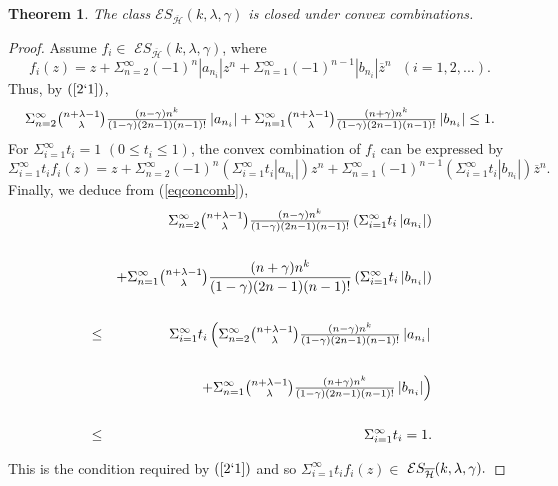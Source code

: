\documentclass[12pt,reqno]{amsart}
\newtheorem{theorem}{Theorem}
\begin{document}
\begin{theorem}
The class $\mathcal{E}S_{\overline{\mathcal{H}}}(k,\lambda ,\gamma)$ is closed under convex combinations.
\end{theorem}

\begin{proof}
Assume $f_{i}\in $ $\mathcal{E}S_{\overline{\mathcal{H}}}(k,\lambda ,\gamma )$, where
\begin{equation*}
f_{i}(z)=z+\Sigma_{n=2}^{\infty}(-1)^{n}\left\vert
a_{n_{i}}\right\vert z^{n}+\Sigma_{n=1}^{\infty}
(-1)^{n-1}\left\vert b_{n_{i}}\right\vert \overline{z}^{n} \ \ \ (i=1,2,...).
\end{equation*}%
Thus, by $(\ref{2`1})$,%
\begin{equation}
\Sigma_{n=2}^{\infty}\tbinom{n+\lambda -1}{\lambda }\tfrac{(n-\gamma )n^{k}}{(1-\gamma )(2n-1)(n-1)!}\left\vert a_{n_{i}}\right\vert +
\Sigma_{n=1}^{\infty}\tbinom{n+\lambda -1}{\lambda }\tfrac{
(n+\gamma )n^{k}}{(1-\gamma )(2n-1)(n-1)!}\left\vert b_{n_{i}}\right\vert
\leq 1.  \label{eqconcomb}
\end{equation}%
For $\Sigma_{i=1}^{\infty}t_{i}=1$ $\left( 0\leq
t_{i}\leq 1\right) $, the convex combination of $f_{i}$ can be expressed by%
\begin{equation*}
\Sigma_{i=1}^{\infty}t_{i}f_{i}(z)=z+\Sigma_{n=2}^{\infty}(-1)^{n}\left( \Sigma_{i=1}^{\infty}
t_{i}\left\vert a_{n_{i}}\right\vert \right) z^{n}+\Sigma_{n=1}^{\infty}(-1)^{n-1}\left( \Sigma_{i=1}^{\infty}t_{i}\left\vert b_{n_{i}}\right\vert \right) \overline{z}^{n}.
\end{equation*}
Finally, we deduce from (\ref{eqconcomb}),
\begin{eqnarray*}
&&\Sigma_{n=2}^{\infty}\tbinom{n+\lambda -1}{\lambda }%
\tfrac{(n-\gamma )n^{k}}{(1-\gamma )(2n-1)(n-1)!}\left( \Sigma_{i=1}^{\infty}t_{i}\left\vert a_{n_{i}}\right\vert \right) \\
&& \\
&&+\Sigma_{n=1}^{\infty}\tbinom{n+\lambda -1}{\lambda }%
\frac{(n+\gamma )n^{k}}{(1-\gamma )(2n-1)(n-1)!}\left( \Sigma_{i=1}^{\infty}t_{i}\left\vert b_{n_{i}}\right\vert \right) \\
&& \\
&\leq &\Sigma_{i=1}^{\infty}t_{i}\left( \Sigma_{n=2}^{\infty}\tbinom{n+\lambda -1}{\lambda }\tfrac{(n-\gamma )n^{k}%
}{(1-\gamma )(2n-1)(n-1)!}\left\vert a_{n_{i}}\right\vert \right. \\
&& \\
&&\left. +\Sigma_{n=1}^{\infty}\tbinom{n+\lambda -1}{%
\lambda }\tfrac{(n+\gamma )n^{k}}{(1-\gamma )(2n-1)(n-1)!}\left\vert
b_{n_{i}}\right\vert \right) \\
&& \\
&\leq &\Sigma_{i=1}^{\infty}t_{i}=1.
\end{eqnarray*}

This is the condition required by $(\ref{2`1})$ and so $\Sigma_{i=1}^{\infty}t_{i}f_{i}(z)\in $ $\mathcal{E}S_{\overline{%
\mathcal{H}}}(k,\lambda ,\gamma ).$
\end{proof}
\end{document}
